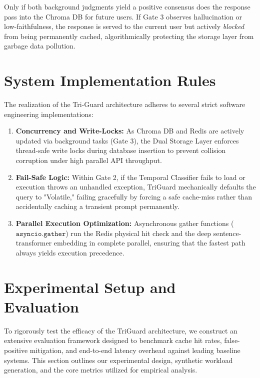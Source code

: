 \documentclass[sigconf]{acmart}
\begin{document}
Only if both background judgments yield a positive consensus does the response pass into the Chroma DB for future users. If Gate 3 observes hallucination or low-faithfulness, the response is served to the current user but actively \textit{blocked} from being permanently cached, algorithmically protecting the storage layer from garbage data pollution.

\section{System Implementation Rules}

The realization of the Tri-Guard architecture adheres to several strict software engineering implementations:
\begin{enumerate}
    \item \textbf{Concurrency and Write-Locks:} As Chroma DB and Redis are actively updated via background tasks (Gate 3), the Dual Storage Layer enforces thread-safe write locks during database insertion to prevent collision corruption under high parallel API throughput.
    \item \textbf{Fail-Safe Logic:} Within Gate 2, if the Temporal Classifier fails to load or execution throws an unhandled exception, TriGuard mechanically defaults the query to "Volatile," failing gracefully by forcing a safe cache-miss rather than accidentally caching a transient prompt permanently.
    \item \textbf{Parallel Execution Optimization:} Asynchronous gather functions ($\texttt{asyncio.gather}$) run the Redis physical hit check and the deep sentence-transformer embedding in complete parallel, ensuring that the fastest path always yields execution precedence.
\end{enumerate}

\newpage
\section{Experimental Setup and Evaluation}

To rigorously test the efficacy of the TriGuard architecture, we construct an extensive evaluation framework designed to benchmark cache hit rates, false-positive mitigation, and end-to-end latency overhead against leading baseline systems. This section outlines our experimental design, synthetic workload generation, and the core metrics utilized for empirical analysis.
\end{document}
